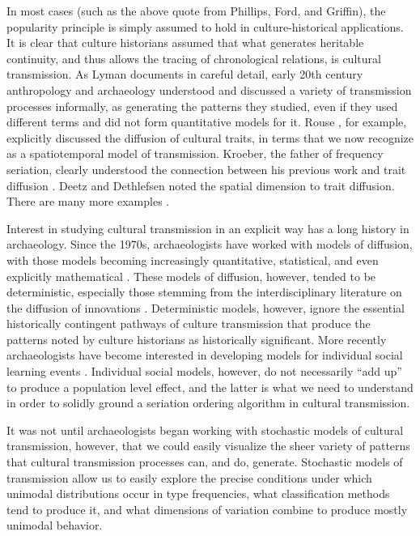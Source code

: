 \documentclass[graybox,natbib]{svmult}
\begin{document}
In most cases (such as the above quote from Phillips, Ford, and
Griffin), the popularity principle is simply assumed to hold in
culture-historical applications. It is clear that culture historians
assumed that what generates heritable continuity, and thus allows the
tracing of chronological relations, is cultural transmission. As Lyman
\citeyearpar{Lyman2008} documents in careful detail, early 20th century
anthropology and archaeology understood and discussed a variety of
transmission processes informally, as generating the patterns they
studied, even if they used different terms and did not form quantitative
models for it. Rouse \citeyearpar{Rouse1939}, for example, explicitly
discussed the diffusion of cultural traits, in terms that we now
recognize as a spatiotemporal model of transmission. Kroeber, the father
of frequency seriation, clearly understood the connection between his
previous work and trait diffusion \citep{kroeber1937diffusion}. Deetz
and Dethlefsen \citetext{\citeyear{Deetz1965a}; \citeyear{Deetz1971}}
noted the spatial dimension to trait diffusion. There are many more
examples \citep{Lyman2008}.

Interest in studying cultural transmission in an explicit way has a long
history in archaeology. Since the 1970s, archaeologists have worked with
models of diffusion, with those models becoming increasingly
quantitative, statistical, and even explicitly mathematical
\citep[e.g.,][]{ammerman1971measuring}. These models of diffusion,
however, tended to be deterministic, especially those stemming from the
interdisciplinary literature on the diffusion of innovations
\citep[e.g.,][]{Rogers2003}. Deterministic models, however, ignore the
essential historically contingent pathways of culture transmission that
produce the patterns noted by culture historians as historically
significant. More recently archaeologists have become interested in
developing models for individual social learning events
\citep[e.g.,][]{Mesoudi2008}. Individual social models, however, do not
necessarily ``add up'' to produce a population level effect, and the
latter is what we need to understand in order to solidly ground a
seriation ordering algorithm in cultural transmission.

It was not until archaeologists began working with stochastic models of
cultural transmission, however, that we could easily visualize the sheer
variety of patterns that cultural transmission processes can, and do,
generate. Stochastic models of transmission allow us to easily explore
the precise conditions under which unimodal distributions occur in type
frequencies, what classification methods tend to produce it, and what
dimensions of variation combine to produce mostly unimodal behavior.
\end{document}
